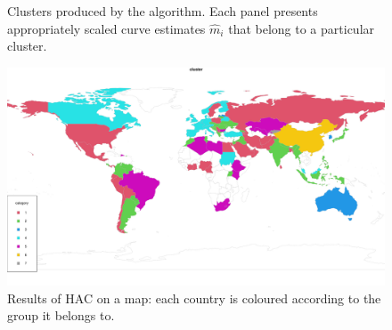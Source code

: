 \documentclass[a4paper,11pt]{article}
\numberwithin{equation}{section}
\begin{document}
\begin{figure}
\ContinuedFloat
\centering
\begin{subfigure}[b]{0.48\textwidth}
\end{subfigure}
\caption{Clusters produced by the algorithm. Each panel presents appropriately scaled curve estimates $\widehat{m}_i$ that belong to a particular cluster.}\label{fig:clusters}
\end{figure}

\begin{figure}[t!]
\begin{minipage}[t]{0.98\textwidth}
\includegraphics[width=\textwidth]{plots/choropleth}
\caption{Results of HAC on a map: each country is coloured according to the group it belongs to.}\label{fig:map}
\end{minipage}
\end{figure}


\clearpage

{\small
\setlength{\bibsep}{0.35em}
}
\end{document}
